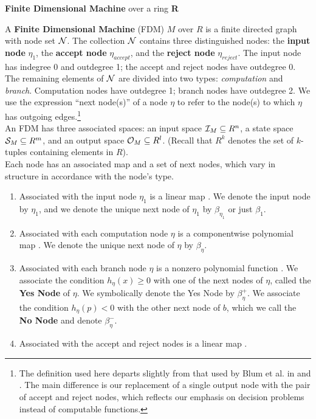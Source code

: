 \begin{definition}{\textbf{Finite Dimensional Machine} over a ring
    \textbf{R}}
  
  A \textbf{Finite Dimensional Machine} (FDM) $M$ over $R$ is a finite
  directed graph with node set $\mathcal{N}$.  The collection $\mathcal{N}$
  contains three distinguished nodes: the \textbf{input node}
  $\eta_1$, the \textbf{accept node} $\eta_{accept}$, and the
  \textbf{reject node} $\eta_{reject}$. The input node has indegree 0
  and outdegree 1; the accept and reject nodes have outdegree 0.  The
  remaining elements of $\mathcal{N}$ are divided into two types:
  \emph{computation} and \emph{branch}. Computation nodes have
  outdegree 1; branch nodes have outdegree 2.  We use the expression
  ``next node(s)'' of a node $\eta$ to refer to the node(s) to which
  $\eta$ has outgoing edges.\footnote{The definition used here departs
    slightly from that used by Blum et al. in \cite{B98} and
    \cite{B89}.  The main difference is our replacement of a single
    output node with the pair of accept and reject nodes, which
    reflects our emphasis on decision problems instead of computable
    functions.}\\
  
  An FDM has three associated spaces: an input space $\mathcal{I}_M
  \subseteq R^n$, a state space $\mathcal{S}_M \subseteq R^m$, and an
  output space $\mathcal{O}_M \subseteq R^l$.  (Recall that $R^k$
  denotes the set of $k$-tuples containing elements in $R$).\\

  Each node has an associated map and a set of next nodes, which vary
  in structure in accordance with the node's type.

  \begin{enumerate}
  \item Associated with the input node $\eta_1$ is a linear map
    . We denote the input node
    by $\eta_1$, and we denote the unique next node of $\eta_1$ by
    $\beta_{\eta_1}$ or just $\beta_1$.
    
  \item Associated with each computation node $\eta$ is a
    componentwise polynomial map
    . We denote the
    unique next node of $\eta$ by $\beta_\eta$.
    
  \item Associated with each branch node $\eta$ is a nonzero
    polynomial function .  We
    associate the condition $h_\eta(x) \geq 0$ with one of the next
    nodes of $\eta$, called the \textbf{Yes Node} of $\eta$.  We
    symbolically denote the Yes Node by $\beta_\eta^+$. We associate
    the condition $h_\eta(p) < 0$ with the other next node of $b$,
    which we call the \textbf{No Node} and denote $\beta_\eta^-$.
    
  \item Associated with the accept and reject nodes is a linear map
    .
  \end{enumerate}
\end{definition}

